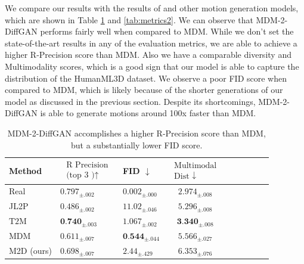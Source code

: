 \documentclass[10pt,twocolumn,letterpaper]{article}
\begin{document}
We compare our results with the results of \cite{Tevet23} and other motion generation models, which are shown in Table \ref{tab:metrics} 
and \ref{tab:metrics2}. We can observe that MDM-2-DiffGAN performs fairly well when compared to MDM. While we don't set the state-of-the-art
results in any of the evaluation metrics, we are able to achieve a higher R-Precision score than MDM. Also we have a comparable diversity and Multimodality
scores, which is a good sign that our model is able to capture the distribution of the HumanML3D dataset. We observe a poor FID score when
compared to MDM, which is likely because of the shorter generations of our model as discussed in the previous section.  Despite its shortcomings, MDM-2-DiffGAN is able to generate motions
around 100x faster than MDM.

\begin{table}[H]
    \centering
    \begin{tabular}{|p{1.4cm}|p{1.8cm}|p{1.5cm}|c|c|c|c|c|c|}
    \hline Method & $\begin{array}{l}\text { R Precision } \\
    \text { (top } 3 \text { )↑ }\end{array}$ & FID $\downarrow$ & $\begin{array}{c}\text { Multimodal } \\
    \text { Dist } \downarrow\end{array}$ \\
    \hline Real & $0.797_{ \pm .002}$ & $0.002_{ \pm .000}$ & $2.974_{ \pm .008}$ \\
    \hline JL2P & $0.486_{ \pm .002}$ & $11.02_{ \pm .046}$ & $5.296_{ \pm .008}$ \\
    \hline $\mathrm{T} 2 \mathrm{M}$ & $\textbf{0.740}_{ \pm .003}$ & $1.067_{ \pm .002}$ & $\textbf{3.340}_{ \pm .008}$ \\
    \hline MDM & $0.611_{ \pm .007}$ & $\textbf{0.544}_{ \pm .044}$ & $5.566_{ \pm .027}$ \\
    \hline M2D (ours) & $0.698_{ \pm .007}$ & $2.44_{ \pm .429}$ & $6.353_{ \pm .076}$ \\
    \hline
    \end{tabular}
    \caption{MDM-2-DiffGAN accomplishes a higher R-Precision score than MDM, but a substantially lower FID score.}
    \label{tab:metrics}
\end{table}
\end{document}
